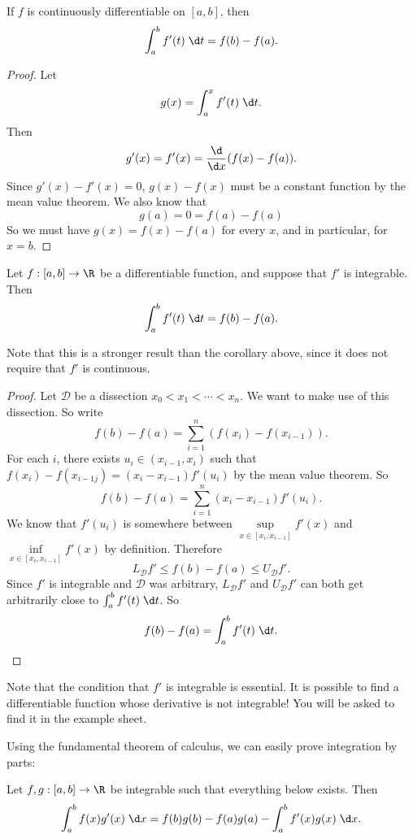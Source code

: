 \documentclass[a4paper]{article}
\begin{document}
\begin{cor}
  If $f$ is continuously differentiable on $[a, b]$, then
  \[
    \int_a^b f'(t)\;\d t = f(b) - f(a).
  \]
\end{cor}

\begin{proof}
  Let
  \[
    g(x) = \int_a^x f'(t)\;\d t.
  \]
  Then
  \[
    g'(x) = f'(x) = \frac{\d }{\d x}(f(x) - f(a)).
  \]
  Since $g'(x) - f'(x) = 0$, $g(x) - f(x)$ must be a constant function by the mean value theorem. We also know that
  \[
    g(a) = 0 = f(a) - f(a)
  \]
  So we must have $g(x) = f(x) - f(a)$ for every $x$, and in particular, for $x = b$.
\end{proof}

\begin{thm}
  Let $f: [a, b] \to \R$ be a differentiable function, and suppose that $f'$ is integrable. Then
  \[
    \int_a^b f'(t)\;\d t = f(b) - f(a).
  \]
\end{thm}
Note that this is a stronger result than the corollary above, since it does not require that $f'$ is continuous.

\begin{proof}
  Let $\mathcal{D}$ be a dissection $x_0 < x_1 < \cdots < x_n$. We want to make use of this dissection. So write
  \[
    f(b) - f(a) = \sum_{i = 1}^n (f(x_i) - f(x_{i - 1})).
  \]
  For each $i$, there exists $u_i\in (x_{i - 1}, x_i)$ such that $f(x_i) - f(x_{i - 1j}) = (x_i - x_{i - 1})f'(u_i)$ by the mean value theorem. So
  \[
    f(b) - f(a) = \sum_{i = 1}^n (x_i - x_{i - 1})f'(u_i).
  \]
  We know that $f'(u_i)$ is somewhere between $\sup\limits_{x\in[x_i, x_{i - 1}]}f'(x)$ and $\inf\limits_{x\in[x_i, x_{i - 1}]}f'(x)$ by definition. Therefore
  \[
    L_\mathcal{D} f' \leq f(b) - f(a) \leq U_\mathcal{D} f'.
  \]
  Since $f'$ is integrable and $\mathcal{D}$ was arbitrary, $L_\mathcal{D}f'$ and $U_\mathcal{D}f'$ can both get arbitrarily close to $\int_a^b f'(t)\;\d t$. So
  \[
    f(b) - f(a) = \int_a^b f'(t)\;\d t.\qedhere
  \]
\end{proof}
Note that the condition that $f'$ is integrable is essential. It is possible to find a differentiable function whose derivative is not integrable! You will be asked to find it in the example sheet.

Using the fundamental theorem of calculus, we can easily prove integration by parts:
\begin{thm}
  Let $f, g:[a, b]\to \R$ be integrable such that everything below exists. Then
  \[
    \int_a^b f(x)g'(x)\;\d x = f(b)g(b) - f(a)g(a) - \int_a^b f'(x)g(x)\;\d x.
  \]
\end{thm}
\end{document}
